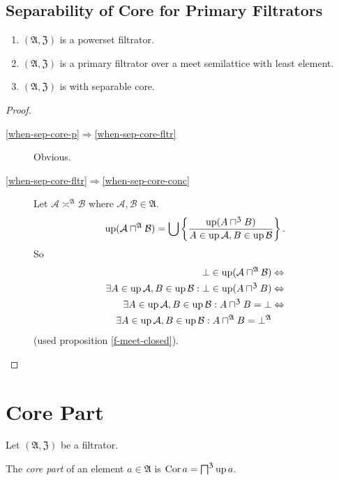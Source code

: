 \subsection{Separability of Core for Primary Filtrators}

\begin{thm}\label{when-sep-core}
\begin{enumerate}
The following is an implications tuple:
\item \label{when-sep-core-p}$(\mathfrak{A},\mathfrak{Z})$ is a powerset
filtrator.
\item \label{when-sep-core-fltr}$(\mathfrak{A},\mathfrak{Z})$ is a primary
filtrator over a meet semilattice with least element.
\item \label{when-sep-core-conc}$(\mathfrak{A},\mathfrak{Z})$ is with
separable core.
\end{enumerate}
\end{thm}
\begin{proof}
~
\begin{description}
\item [{\ref{when-sep-core-p}$\Rightarrow$\ref{when-sep-core-fltr}}] Obvious.
\item [{\ref{when-sep-core-fltr}$\Rightarrow$\ref{when-sep-core-conc}}] Let
$\mathcal{A}\asymp^{\mathfrak{A}}\mathcal{B}$ where $\mathcal{A},\mathcal{B}\in\mathfrak{A}$.
\[
\operatorname{up}(\mathcal{A}\sqcap^{\mathfrak{A}}\mathcal{B})=\bigcup\left\{ \frac{\operatorname{up}(A\sqcap^{\mathfrak{Z}}B)}{A\in\operatorname{up}\mathcal{A},B\in\operatorname{up}\mathcal{B}}\right\}.
\]
So
\begin{align*}
\bot\in\operatorname{up}(\mathcal{A}\sqcap^{\mathfrak{A}}\mathcal{B}) & \Leftrightarrow\\
\exists A\in\operatorname{up}\mathcal{A},B\in\operatorname{up}\mathcal{B}:\bot\in\operatorname{up}(A\sqcap^{\mathfrak{Z}}B) & \Leftrightarrow\\
\exists A\in\operatorname{up}\mathcal{A},B\in\operatorname{up}\mathcal{B}:A\sqcap^{\mathfrak{Z}}B=\bot & \Leftrightarrow\\
\exists A\in\operatorname{up}\mathcal{A},B\in\operatorname{up}\mathcal{B}:A\sqcap^{\mathfrak{A}}B=\bot^{\mathfrak{A}}
\end{align*}
(used proposition \ref{f-meet-closed}).
\end{description}
\end{proof}

\section{Core Part}\label{sec-filtrator-core-part}
Let $(\mathfrak{A},\mathfrak{Z})$ be a filtrator.
\begin{defn}
The \emph{core part} of an element $a\in\mathfrak{A}$
is $\operatorname{Cor} a=\bigsqcap^{\mathfrak{Z}}\operatorname{up} a$.
\end{defn}

